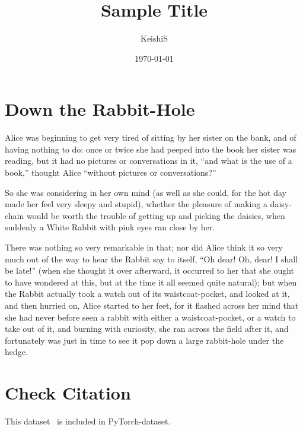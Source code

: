 \documentclass[10pt]{article}
\title{Sample Title}
\author{KeishiS}
\date{\today}
\begin{document}
\maketitle

\section{Down the Rabbit-Hole}

Alice was beginning to get very tired of sitting by her sister on the bank, and of having nothing to do: once or twice she had peeped into the book her sister was reading, but it had no pictures or conversations in it, “and what is the use of a book,” thought Alice “without pictures or conversations?”

So she was considering in her own mind (as well as she could, for the hot day made her feel very sleepy and stupid), whether the pleasure of making a daisy-chain would be worth the trouble of getting up and picking the daisies, when suddenly a White Rabbit with pink eyes ran close by her.

There was nothing so very remarkable in that; nor did Alice think it so very much out of the way to hear the Rabbit say to itself, “Oh dear! Oh, dear! I shall be late!” (when she thought it over afterward, it occurred to her that she ought to have wondered at this, but at the time it all seemed quite natural); but when the Rabbit actually took a watch out of its waistcoat-pocket, and looked at it, and then hurried on, Alice started to her feet, for it flashed across her mind that she had never before seen a rabbit with either a waistcoat-pocket, or a watch to take out of it, and burning with curiosity, she ran across the field after it, and fortunately was just in time to see it pop down a large rabbit-hole under the hedge.

\section{Check Citation}

This dataset~\cite{Morris2020-cq} is included in PyTorch-dataset.



\end{document}

